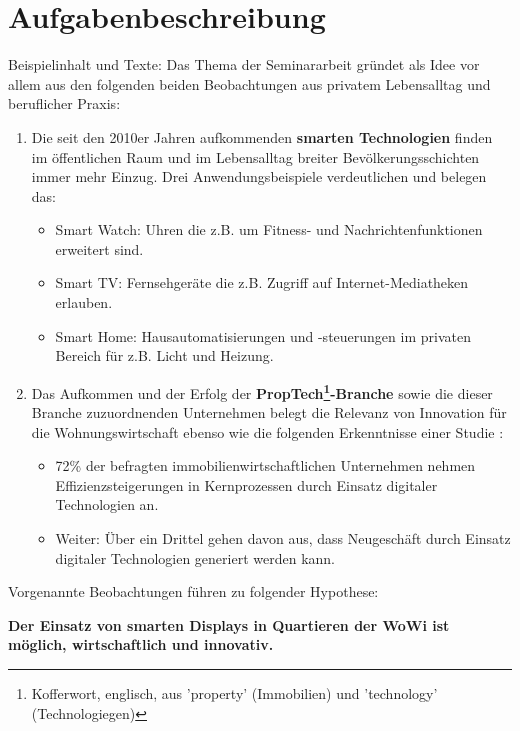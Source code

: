 




\section{Aufgabenbeschreibung}
Beispielinhalt und Texte:
Das Thema der Seminararbeit gründet als Idee vor allem aus den folgenden beiden Beobachtungen aus privatem Lebensalltag und beruflicher Praxis: 
\begin{enumerate}
	\item Die seit den 2010er Jahren aufkommenden \textbf{smarten Technologien} finden im öffentlichen Raum und im Lebensalltag breiter Bevölkerungsschichten immer mehr Einzug. Drei Anwendungsbeispiele verdeutlichen und belegen das: 
	\begin{itemize}
	 \item Smart Watch: Uhren die z.B. um Fitness- und Nachrichtenfunktionen erweitert sind.
	 \item Smart TV: Fernsehgeräte die z.B. Zugriff auf Internet-Mediatheken erlauben.
	 \item Smart Home: Hausautomatisierungen und -steuerungen im privaten Bereich für  z.B. Licht und Heizung.
	 \end{itemize}

	 \item Das Aufkommen und der Erfolg der \textbf{PropTech\footnote{Kofferwort, englisch, aus 'property' (Immobilien) und 'technology' (Technologiegen)}-Branche} sowie die dieser Branche zuzuordnenden Unternehmen belegt die Relevanz von Innovation für die Wohnungswirtschaft ebenso wie die folgenden Erkenntnisse einer Studie \parencite[S. 18]{zia}:
	 \begin{itemize}
		 \item 72\% der befragten immobilienwirtschaftlichen Unternehmen nehmen Effizienzsteigerungen in Kernprozessen durch Einsatz digitaler Technologien an.
		 \item Weiter: Über ein Drittel gehen davon aus, dass Neugeschäft durch Einsatz digitaler Technologien generiert werden kann. 
	 \end{itemize}
\end{enumerate}

Vorgenannte Beobachtungen führen zu folgender Hypothese:

 \Rightarrow \textbf{Der Einsatz von smarten Displays in Quartieren der \ac{WoWi} ist möglich, wirtschaftlich und innovativ.}



